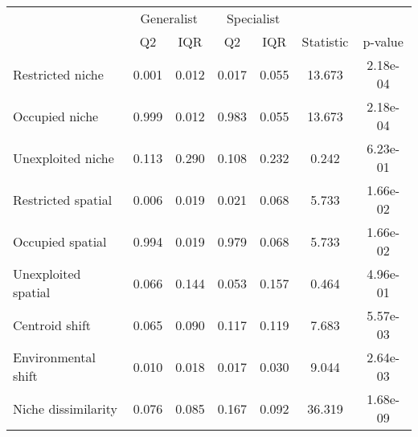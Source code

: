 \begin{table}
\centering\centering
\begin{tabular}{l|c|c|c|c|c|c}
\hline
\multicolumn{1}{c|}{ } & \multicolumn{2}{c|}{Generalist} & \multicolumn{2}{c|}{Specialist} & \multicolumn{2}{c}{ } \\
\cline{2-3} \cline{4-5}
  & Q2 & IQR & Q2 & IQR & Statistic & p-value\\
\hline
Restricted niche & 0.001 & 0.012 & 0.017 & 0.055 & 13.673 & 2.18e-04\\
\hline
Occupied niche & 0.999 & 0.012 & 0.983 & 0.055 & 13.673 & 2.18e-04\\
\hline
Unexploited niche & 0.113 & 0.290 & 0.108 & 0.232 & 0.242 & 6.23e-01\\
\hline
Restricted spatial & 0.006 & 0.019 & 0.021 & 0.068 & 5.733 & 1.66e-02\\
\hline
Occupied spatial & 0.994 & 0.019 & 0.979 & 0.068 & 5.733 & 1.66e-02\\
\hline
Unexploited spatial & 0.066 & 0.144 & 0.053 & 0.157 & 0.464 & 4.96e-01\\
\hline
Centroid shift & 0.065 & 0.090 & 0.117 & 0.119 & 7.683 & 5.57e-03\\
\hline
Environmental shift & 0.010 & 0.018 & 0.017 & 0.030 & 9.044 & 2.64e-03\\
\hline
Niche dissimilarity & 0.076 & 0.085 & 0.167 & 0.092 & 36.319 & 1.68e-09\\
\hline
\end{tabular}
\end{table}